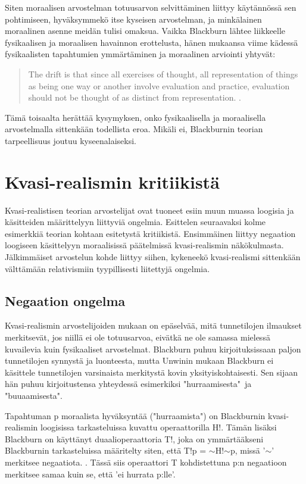 \documentclass[a4paper,12pt,times,titlepage,finnish]{article}
\begin{document}
Siten moraalisen arvostelman totuusarvon selvittäminen liittyy käytännössä sen pohtimiseen, hyväksymmekö itse kyseisen arvostelman, ja minkälainen moraalinen asenne meidän tulisi omaksua. Vaikka Blackburn lähtee liikkeelle fysikaalisen ja moraalisen havainnon erottelusta, hänen mukaansa viime kädessä fysikaalisten tapahtumien ymmärtäminen ja moraalinen arviointi yhtyvät: 

\begin{quote}
 The drift is that since all exercises of thought, all representation of things as being one way or another involve evaluation and practice, evaluation should not be thought of as distinct from representation. \citep[81]{Blackburn98}. 
\end{quote}

Tä\-mä toisaalta herättää kysymyksen, onko fysikaalisella ja moraalisella arvostelmalla sittenkään todellista eroa. Mikäli ei, Blackburnin teorian tarpeellisuus joutuu kyseenalaiseksi.

\section{Kvasi-realismin kritiikistä}

Kvasi-realistisen teorian arvostelijat ovat tuoneet esiin muun muassa loogisia ja käsitteiden määrittelyyn liittyviä ongelmia. Esittelen seuraavaksi kolme esimerkkiä teorian kohtaan esitetystä kritiikistä. Ensimmäinen liittyy negaation loogiseen käsittelyyn moraalisissä päätelmissä kvasi-\-realismin näkökulmasta. Jälkimmäiset arvostelun kohde liittyy siihen, kykeneekö kvasi-\-realismi sittenkään välttämään relativismiin tyypillisesti liitettyjä ongelmia.

\subsection{Negaation ongelma}

Kvasi-realismin arvostelijoiden mukaan on epäselvää, mitä tunnetilojen ilmaukset merkitsevät, jos niillä ei ole totuusarvoa, eivätkä ne ole samassa mielessä kuvailevia kuin fysikaaliset arvostelmat. Blackburn puhuu kirjoituksissaan paljon tunnetilojen synnystä ja luonteesta, mutta Unwinin mukaan Blackburn ei kä\-sit\-te\-le tunnetilojen varsinaista merkitystä kovin yksityiskohtaisesti. Sen sijaan hän puhuu kirjoitustensa yhteydessä esimerkiksi "hurraamisesta"\ ja "buuaamisesta". 

Tapahtuman p moraalista hyväksyntää ("hurraamista") on Blackburnin kvasi-\-realismin loogisissa tarkasteluissa kuvattu operaattorilla H!. Tä\-män lisäksi Blackburn on käyttänyt duaalioperaattoria T!, joka on ymmärtääkseni Blackburnin tarkasteluissa määritelty siten, että T!p = \(\sim\)H!\(\sim\)p, missä '\(\sim\)' merkitsee negaatiota. \citep[341]{Unwin99}. Tässä siis operaattori T kohdistettuna p:n negaatioon merkitsee samaa kuin se, että 'ei hurrata p:lle'.
\end{document}
